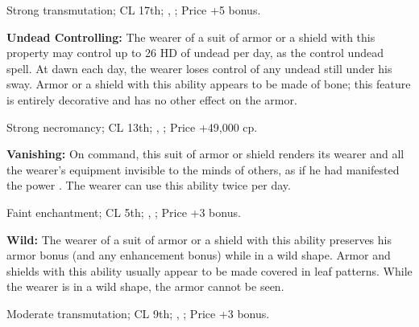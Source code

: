 Strong transmutation; CL 17th; , ; Price +5 bonus.

\textbf{Undead Controlling:} The wearer of a suit of armor or a shield with this property may control up to 26 HD of undead per day, as the control undead spell. At dawn each day, the wearer loses control of any undead still under his sway. Armor or a shield with this ability appears to be made of bone; this feature is entirely decorative and has no other effect on the armor.

Strong necromancy; CL 13th; , ; Price +49,000 cp.

\textbf{Vanishing:} On command, this suit of armor or shield renders its wearer and all the wearer's equipment invisible to the minds of others, as if he had manifested the power . The wearer can use this ability twice per day.

Faint enchantment; CL 5th; , ; Price +3 bonus.

\textbf{Wild:} The wearer of a suit of armor or a shield with this ability preserves his armor bonus (and any enhancement bonus) while in a wild shape. Armor and shields with this ability usually appear to be made covered in leaf patterns. While the wearer is in a wild shape, the armor cannot be seen.

Moderate transmutation; CL 9th; , ; Price +3 bonus. 
